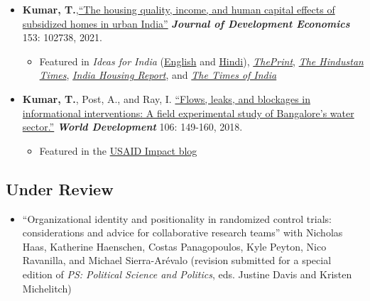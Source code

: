 \documentclass[11pt]{article}
\begin{document}
\begin{itemize}
			\item[]\textbf{Kumar, T.},\href{https://doi.org/10.1016/j.jdeveco.2021.102738}{``The housing quality, income, and human capital effects of subsidized homes in urban India''} \textit{\textbf{Journal of Development Economics}} 153: 102738, 2021.
\begin{itemize}
	\item Featured in \textit{Ideas for India} (\href{https://www.ideasforindia.in/topics/poverty-inequality/household-level-effects-of-affordable-housing-evidence-from-mumbai.html}{English} and \href{https://www.ideasforindia.in/topics/poverty-inequality/household-level-effects-of-affordable-housing-evidence-from-mumbai-hindi.html}{Hindi}), \href{https://theprint.in/opinion/mumbai-residents-win-govt-housing-lottery-and-spend-more-on-kids-education-jobs-study/290485/}{\textit{ThePrint}}, \href{https://www.hindustantimes.com/opinion/housing-is-a-welfare-weapon-it-can-help-people-escape-poverty-101629993983576.html}{\textit{The Hindustan Times}}, \href{https://indiahousingreport.in/outputs/opinion/housing-is-a-welfare-weapon-it-can-help-people-escape-poverty/}{\textit{India Housing Report}}, and \href{https://timesofindia.indiatimes.com/city/mumbai/mhada-home-winners-see-upswing-in-family-edu-pay-in-mumbai-study/articleshow/86468320.cms}{\textit{The Times of India}}

\end{itemize}

		\item[] \textbf{Kumar, T.}, Post, A., and Ray, I. \href{https://www.sciencedirect.com/science/article/pii/S0305750X1830032}{``Flows, leaks, and blockages in informational interventions: A field experimental study of Bangalore's water sector.''} \textit{\textbf{World Development} }106: 149-160, 2018.
		\begin{itemize}[nosep]
		\item Featured in the \href{https://blog.usaid.gov/2016/05/using-mobile-phones-to-alert-households-waiting-for-nextdrop-of-water/}{USAID Impact blog}
		\end{itemize}
		

\end{itemize}

\subsection*{Under Review}

\begin{itemize}




	

	\item[]``Organizational identity and positionality in randomized control trials: considerations and advice for collaborative research teams'' with Nicholas Haas, Katherine Haenschen, Costas Panagopoulos, Kyle Peyton, Nico Ravanilla, and Michael  Sierra-Ar\'{e}valo (revision submitted for a special edition of \textit{PS: Political Science and Politics}, eds. Justine Davis and Kristen Michelitch)
		
		\end{itemize}
		
\end{document}
